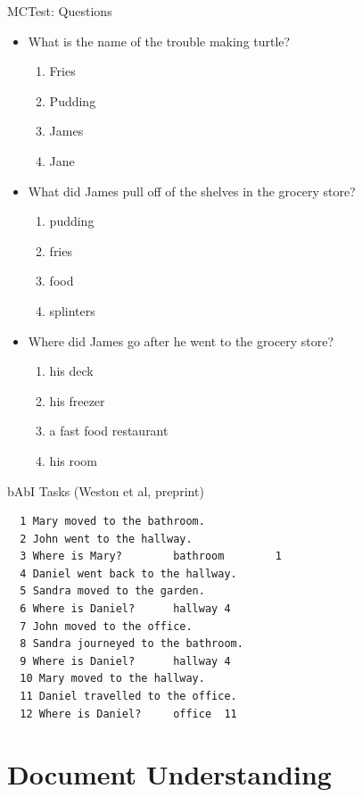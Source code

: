 \documentclass{beamer}
\begin{document}
\begin{frame}{MCTest: Questions}
  \begin{itemize}
   

  \item What is the name of the trouble making turtle?
    \begin{enumerate}
    \item Fries  \item Pudding \item James \item Jane
    \end{enumerate}
    \item What did James pull off of the shelves in the grocery store?
      \begin{enumerate}
      \item  pudding \item fries \item food \item splinters
      \end{enumerate}
    \item Where did James go after he went to the grocery store?
      \begin{enumerate}
      \item  his deck \item his freezer \item a fast food restaurant \item
        his room
      \end{enumerate}
  \end{itemize}
\end{frame}

\begin{frame}[fragile]{bAbI Tasks (Weston et al, preprint) }
\begin{verbatim}
  1 Mary moved to the bathroom.
  2 John went to the hallway.
  3 Where is Mary?        bathroom        1
  4 Daniel went back to the hallway.
  5 Sandra moved to the garden.
  6 Where is Daniel?      hallway 4
  7 John moved to the office.
  8 Sandra journeyed to the bathroom.
  9 Where is Daniel?      hallway 4
  10 Mary moved to the hallway.
  11 Daniel travelled to the office.
  12 Where is Daniel?     office  11
\end{verbatim}
\end{frame}

\section{Document Understanding}
\end{document}
